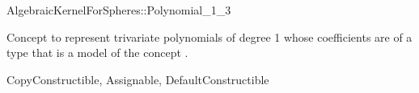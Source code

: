 \begin{ccRefConcept}{AlgebraicKernelForSpheres::Polynomial_1_3}

\ccDefinition

Concept to represent trivariate polynomials of degree 1 whose
coefficients are of a type that is a model of the concept
.

\ccRefines
CopyConstructible, Assignable, DefaultConstructible






\ccHasModels


\ccSeeAlso


\end{ccRefConcept}
